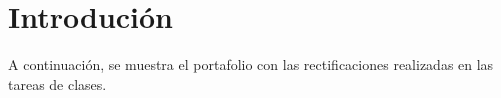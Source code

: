 \documentclass{article}
\begin{document}

\section{Introdución}

A continuación, se muestra el portafolio con las rectificaciones realizadas en las tareas de clases.















\end{document}
